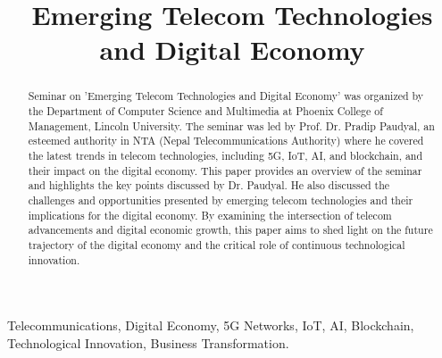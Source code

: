 \documentclass[conference]{IEEEtran}
\begin{document}
\title{Emerging Telecom Technologies and Digital Economy}

\author{
}

\maketitle

\begin{abstract}
    Seminar on 'Emerging Telecom Technologies and Digital Economy' was organized by the Department of Computer Science and Multimedia at Phoenix College of Management, Lincoln University. The seminar was led by Prof. Dr. Pradip Paudyal, an esteemed authority in NTA (Nepal Telecommunications Authority) where he covered the latest trends in telecom technologies, including 5G, IoT, AI, and blockchain, and their impact on the digital economy. This paper provides an overview of the seminar and highlights the key points discussed by Dr. Paudyal. He also discussed the challenges and opportunities presented by emerging telecom technologies and their implications for the digital economy. By examining the intersection of telecom advancements and digital economic growth, this paper aims to shed light on the future trajectory of the digital economy and the critical role of continuous technological innovation.
\end{abstract}

\begin{IEEEkeywords}
    Telecommunications, Digital Economy, 5G Networks, IoT, AI, Blockchain, Technological Innovation, Business Transformation.
\end{IEEEkeywords}
\end{document}
